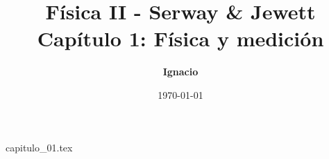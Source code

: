 \documentclass[11pt,spanish,oneside]{report}
\title{\textbf{Física II - Serway \& Jewett} \\ \Large Capítulo 1: Física y medición}
\author{\textbf{Ignacio}}
\date{\today}
\begin{document}
\maketitle

{capitulo_01.tex}
\end{document}
